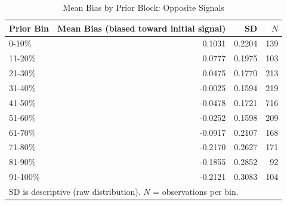 \begin{table}[htbp]
\centering
\caption{Mean Bias by Prior Block: Opposite Signals}
\label{tab:opp_bias_prior}
\begin{tabular}{lrrr}
\hline
Prior Bin & Mean Bias (biased toward initial signal) & SD & $N$ \\
\hline
0-10\% & 0.1031 & 0.2204 & 139 \\
11-20\% & 0.0777 & 0.1975 & 103 \\
21-30\% & 0.0475 & 0.1770 & 213 \\
31-40\% & -0.0025 & 0.1594 & 219 \\
41-50\% & -0.0478 & 0.1721 & 716 \\
51-60\% & -0.0252 & 0.1598 & 209 \\
61-70\% & -0.0917 & 0.2107 & 168 \\
71-80\% & -0.2170 & 0.2627 & 171 \\
81-90\% & -0.1855 & 0.2852 & 92 \\
91-100\% & -0.2121 & 0.3083 & 104 \\
\hline
\multicolumn{4}{l}{\small SD is descriptive (raw distribution). $N$ = observations per bin.} \\
\end{tabular}
\end{table}
